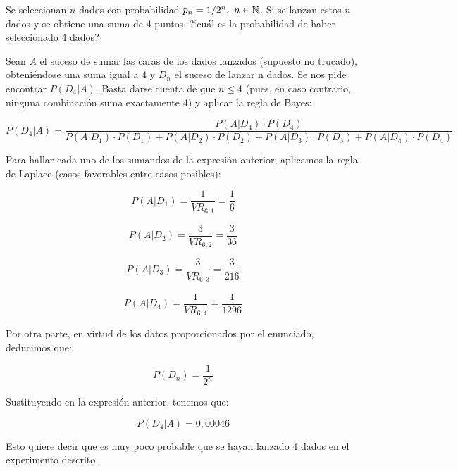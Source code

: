 \problem
Se seleccionan $n$ dados con probabilidad $p_{n} =1/2^{n}, \ n\in \Bbb N$.
Si se lanzan estos $n$
dados y se obtiene una suma de 4 puntos, ?`cu{\'a}l es la probabilidad de  haber  seleccionado
4 dados?

Sean $A$ el suceso de sumar las caras de los dados lanzados (supuesto no trucado), obteniéndose una suma igual a 4 y $D_n$ el suceso de lanzar n dados. Se nos pide encontrar $P(D_4 | A)$. Basta darse cuenta de que $n \leq 4$ (pues, en caso contrario, ninguna combinación suma exactamente 4) y aplicar la regla de Bayes:

$$P(D_4 | A) = \frac{P(A | D_4) · P(D_4)}{P(A | D_1)·P(D_1) + P(A | D_2)·P(D_2) + P(A | D_3)·P(D_3) + P(A | D_4)·P(D_4)}$$

Para hallar cada uno de los sumandos de la expresión anterior, aplicamos la regla de Laplace (casos favorables entre casos posibles):

$$P(A | D_1) = \frac{1}{VR_{6,1}} = \frac{1}{6}$$

$$P(A | D_2) = \frac{3}{VR_{6,2}} = \frac{3}{36}$$

$$P(A | D_3) = \frac{3}{VR_{6,3}} = \frac{3}{216}$$

$$P(A | D_4) = \frac{1}{VR_{6,4}} = \frac{1}{1296}$$

Por otra parte, en virtud de los datos proporcionados por el enunciado, deducimos que:

$$P(D_n) = \frac{1}{2^n}$$

Sustituyendo en la expresión anterior, tenemos que: 

$$P(D_4 | A) = 0,00046$$

Esto quiere decir que es muy poco probable que se hayan lanzado 4 dados en el experimento descrito. 